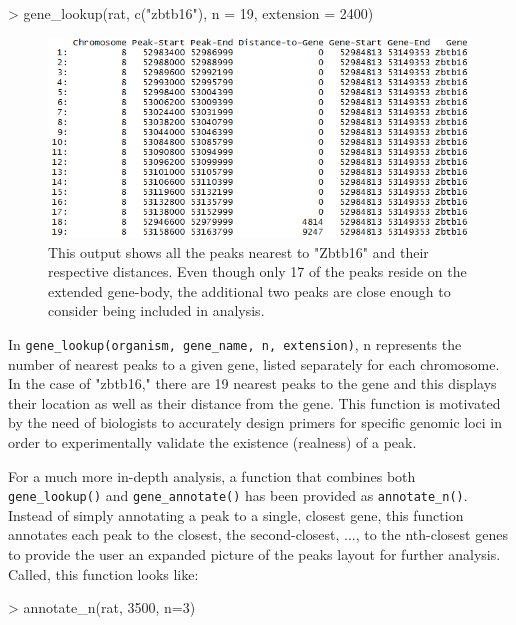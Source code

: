 \documentclass[12pt]{article}
\begin{document}
{\begin{Schunk}
\begin{Sinput}
> gene_lookup(rat, c("zbtb16"), n = 19, extension = 2400)
\end{Sinput}
\end{Schunk}

\begin{figure}[H]
\centering
\includegraphics{figures/vignette_gene_lookup_zbtb16_19.png}
\caption{This output shows all the peaks nearest to "Zbtb16" and their respective distances. Even though only 17 of the peaks reside on the extended gene-body, the additional two peaks are close enough to consider being included in analysis.}
\end{figure}

In \texttt{gene\_lookup(organism, gene\_name, n, extension)}, n represents the number of nearest peaks to a given gene, listed separately for each chromosome. In the case of "zbtb16," there are 19 nearest peaks to the gene and this displays their location as well as their distance from the gene. This function is motivated by the need of biologists to accurately design primers for specific genomic loci in order to experimentally validate the existence (realness) of a peak.

For a much more in-depth analysis, a function that combines both \texttt{gene\_lookup()} and \texttt{gene\_annotate()} has been provided as \texttt{annotate\_n()}. Instead of simply annotating a peak to a single, closest gene, this function annotates each peak to the closest, the second-closest, ..., to the nth-closest genes to provide the user an expanded picture of the peaks layout for further analysis. Called, this function looks like:

\begin{Schunk}
\begin{Sinput}
> annotate_n(rat, 3500, n=3)
\end{Sinput}
\end{Schunk}

}
\end{document}
